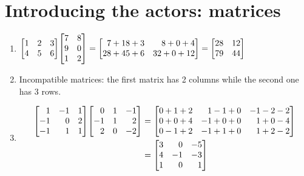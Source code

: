 \section*{Introducing the actors: matrices}

\newenvironment{xmatrix}{\begin{bmatrix*}[r]}{\end{bmatrix*}}

\begin{exercise}{2}
  \begin{enumerate}
    \item $\begin{xmatrix}1 & 2 & 3 \\ 4 & 5 & 6\end{xmatrix}
           \begin{xmatrix}7 & 8 \\ 9 & 0 \\ 1 & 2\end{xmatrix} =
           \begin{xmatrix}
              7 + 18 + 3 &  8 + 0 +  4 \\
             28 + 45 + 6 & 32 + 0 + 12
           \end{xmatrix} =
           \begin{xmatrix}28 & 12 \\ 79 & 44\end{xmatrix}$

    \item Incompatible matrices: the first matrix has 2 columns while the second
          one has 3 rows.

    \item \begin{align*}
            \begin{xmatrix}
               1 & -1 &  1 \\
              -1 &  0 &  2 \\
              -1 &  1 &  1
            \end{xmatrix}
            \begin{xmatrix}
               0 &  1 & -1 \\
              -1 &  1 &  2 \\
               2 &  0 & -2
            \end{xmatrix} &=
            \begin{xmatrix}
              0 + 1 + 2 &  1 - 1 + 0 & -1 - 2 - 2 \\
              0 + 0 + 4 & -1 + 0 + 0 &  1 + 0 - 4 \\
              0 - 1 + 2 & -1 + 1 + 0 &  1 + 2 - 2
            \end{xmatrix} \\ &=
            \begin{xmatrix}
              3 &  0 & -5 \\
              4 & -1 & -3 \\
              1 &  0 &  1
            \end{xmatrix}
          \end{align*}


\end{enumerate}
\end{exercise}
